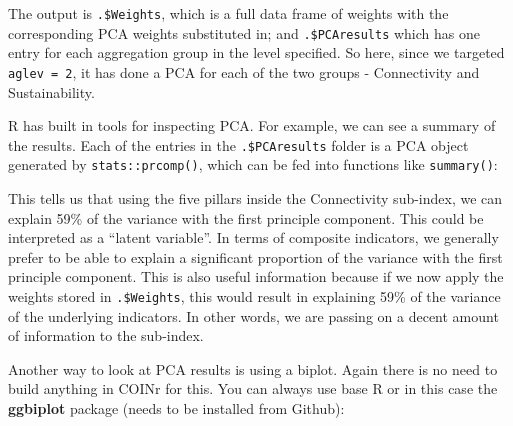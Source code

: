 \documentclass[
]{book}
\newenvironment{Shaded}{\begin{snugshade}}{\end{snugshade}}
\newcommand{\CommentTok}[1]{\textcolor[rgb]{0.56,0.35,0.01}{\textit{#1}}}
\newcommand{\DocumentationTok}[1]{\textcolor[rgb]{0.56,0.35,0.01}{\textbf{\textit{#1}}}}
\newcommand{\FunctionTok}[1]{\textcolor[rgb]{0.00,0.00,0.00}{#1}}
\newcommand{\NormalTok}[1]{#1}
\newcommand{\SpecialCharTok}[1]{\textcolor[rgb]{0.00,0.00,0.00}{#1}}
\begin{document}
The output is \texttt{.\$Weights}, which is a full data frame of weights with the corresponding PCA weights substituted in; and \texttt{.\$PCAresults} which has one entry for each aggregation group in the level specified. So here, since we targeted \texttt{aglev\ =\ 2}, it has done a PCA for each of the two groups - Connectivity and Sustainability.

R has built in tools for inspecting PCA. For example, we can see a summary of the results. Each of the entries in the \texttt{.\$PCAresults} folder is a PCA object generated by \texttt{stats::prcomp()}, which can be fed into functions like \texttt{summary()}:

\begin{Shaded}
\end{Shaded}

This tells us that using the five pillars inside the Connectivity sub-index, we can explain 59\% of the variance with the first principle component. This could be interpreted as a ``latent variable''. In terms of composite indicators, we generally prefer to be able to explain a significant proportion of the variance with the first principle component. This is also useful information because if we now apply the weights stored in \texttt{.\$Weights}, this would result in explaining 59\% of the variance of the underlying indicators. In other words, we are passing on a decent amount of information to the sub-index.

Another way to look at PCA results is using a biplot. Again there is no need to build anything in COINr for this. You can always use base R or in this case the \textbf{ggbiplot} package (needs to be installed from Github):

\begin{Shaded}
\end{Shaded}
\end{document}
